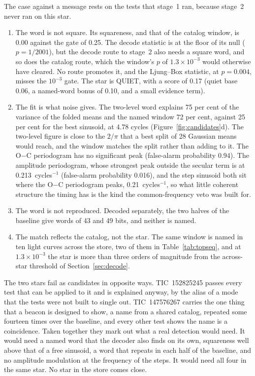\documentclass[final,5p]{elsarticle}
\newcommand{\oc}{O$-$C}
\begin{document}
The case against a message rests on the tests that stage~1 ran, because stage~2 never ran on this star.
\begin{enumerate}
\item The word is not square. Its squareness, and that of the catalog window, is 0.00 against the gate of 0.25. The decode statistic is at the floor of its null ($p=1/2001$), but the decode route to stage~2 also needs a square word, and so does the catalog route, which the window's $p$ of $1.3\times10^{-3}$ would otherwise have cleared. No route promotes it, and the Ljung--Box statistic, at $p=0.004$, misses the $10^{-3}$ gate. The star is QUIET, with a score of 0.17 (quiet base 0.06, a named-word bonus of 0.10, and a small evidence term).
\item The fit is what noise gives. The two-level word explains 75 per cent of the variance of the folded means and the named window 72 per cent, against 25 per cent for the best sinusoid, at 4.78 cycles (Figure~\ref{fig:candidates}d). The two-level figure is close to the $2/\pi$ that a best split of 28 Gaussian means would reach, and the window matches the split rather than adding to it. The \oc{} periodogram has no significant peak (false-alarm probability 0.94). The amplitude periodogram, whose strongest peak outside the secular term is at 0.213~cycles$^{-1}$ (false-alarm probability 0.016), and the step sinusoid both sit where the \oc{} periodogram peaks, 0.21~cycles$^{-1}$, so what little coherent structure the timing has is the kind the common-frequency veto was built for.
\item The word is not reproduced. Decoded separately, the two halves of the baseline give words of 43 and 49 bits, and neither is named.
\item The match reflects the catalog, not the star. The same window is named in ten light curves across the store, two of them in Table~\ref{tab:topseq}, and at $1.3\times10^{-3}$ the star is more than three orders of magnitude from the across-star threshold of Section~\ref{sec:decode}.
\end{enumerate}

The two stars fail as candidates in opposite ways. TIC~152825245 passes every test that can be applied to it and is explained anyway, by the alias of a mode that the tests were not built to single out. TIC~147576267 carries the one thing that a beacon is designed to show, a name from a shared catalog, repeated some fourteen times over the baseline, and every other test shows the name is a coincidence. Taken together they mark out what a real detection would need. It would need a named word that the decoder also finds on its own, squareness well above that of a free sinusoid, a word that repeats in each half of the baseline, and no amplitude modulation at the frequency of the steps. It would need all four in the same star. No star in the store comes close.
\end{document}
